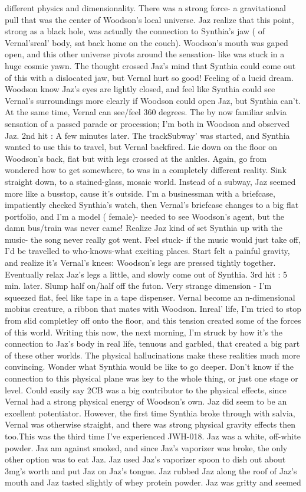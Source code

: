 \documentclass[12pt]{book}
\begin{document}
different physics and dimensionality. There was a strong force- a gravitational pull that was the center of Woodson's local universe. Jaz realize that this point, strong as a black hole, was actually the connection to Synthia's jaw ( of Vernal'sreal' body, sat back home on the couch). Woodson's mouth was gaped open, and this other universe pivots around the sensation- like was stuck in a huge cosmic yawn. The thought crossed Jaz's mind that Synthia could come out of this with a dislocated jaw, but Vernal hurt so good! Feeling of a lucid dream. Woodson know Jaz's eyes are lightly closed, and feel like Synthia could see Vernal's surroundings more clearly if Woodson could open Jaz, but Synthia can't. At the same time, Vernal can see/feel 360 degrees. The by now familiar salvia sensation of a passed parade or procession; I'm both in Woodson and observed Jaz. 2nd hit : A few minutes later. The trackSubway' was started, and Synthia wanted to use this to travel, but Vernal backfired. Lie down on the floor on Woodson's back, flat but with legs crossed at the ankles. Again, go from wondered how to get somewhere, to was in a completely different reality. Sink straight down, to a stained-glass, mosaic world. Instead of a subway, Jaz seemed more like a busstop, cause it's outside. I'm a businessman with a briefcase, impatiently checked Synthia's watch, then Vernal's briefcase changes to a big flat portfolio, and I'm a model ( female)- needed to see Woodson's agent, but the damn bus/train was never came! Realize Jaz kind of set Synthia up with the music- the song never really got went. Feel stuck- if the music would just take off, I'd be travelled to who-knows-what exciting places. Start felt a painful gravity, and realize it's Vernal's knees: Woodson's legs are pressed tightly together. Eventually relax Jaz's legs a little, and slowly come out of Synthia. 3rd hit : 5 min. later. Slump half on/half off the futon. Very strange dimension - I'm squeezed flat, feel like tape in a tape dispenser. Vernal become an n-dimensional mobius creature, a ribbon that mates with Woodson. Inreal' life, I'm tried to stop from slid completley off onto the floor, and this tension created some of the forces of this world. Writing this now, the next morning, I'm struck by how it's the connection to Jaz's body in real life, tenuous and garbled, that created a big part of these other worlds. The physical hallucinations make these realities much more convincing. Wonder what Synthia would be like to go deeper. Don't know if the connection to this physical plane was key to the whole thing, or just one stage or level. Could easily say 2CB was a big contributor to the physical effects, since Vernal had a strong physical energy of Woodson's own. Jaz did seem to be an excellent potentiator. However, the first time Synthia broke through with salvia, Vernal was otherwise straight, and there was strong physical gravity effects then too.This was the third time I've experienced JWH-018. Jaz was a white, off-white powder. Jaz am against smoked, and since Jaz's vaporizer was broke, the only other option was to eat Jaz. Jaz used Jaz's vaporizer spoon to dish out about 3mg's worth and put Jaz on Jaz's tongue. Jaz rubbed Jaz along the roof of Jaz's mouth and Jaz tasted slightly of whey protein powder. Jaz was gritty and seemed 
\end{document}
